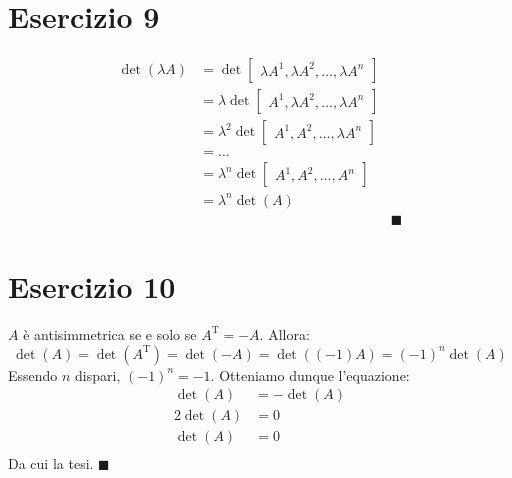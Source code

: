 \documentclass{article}
\newcommand*{\qed}{\blacksquare}
\newcommand*{\T}[1]{{#1}^\text{T}}  %
\newcommand*{\m}[1]{\begin{bmatrix}#1\end{bmatrix}}
\begin{document}
\section*{Esercizio 9}
\[\begin{aligned}
    \det(\lambda A) &=
    \det\m{
        \lambda A^1,\lambda A^2,\dots,\lambda A^n
    } \\ &=
    \lambda \det\m{
        A^1,\lambda A^2,\dots,\lambda A^n
    } \\ &=
    \lambda^2 \det\m{
        A^1, A^2,\dots,\lambda A^n
    } \\ &= \dots \\ &=
    \lambda^n\det\m{
        A^1,A^2,\dots,A^n
    } \\ &=
    \lambda^n\det(A) \\
    &&\qed
\end{aligned}\]

\section*{Esercizio 10}
$A$ è antisimmetrica se e solo se $\T{A}=-A$. Allora:
\[
    \det(A) =
    \det\left(\T{A}\right) =
    \det(-A) =
    \det\left((-1)A\right) =
    (-1)^n \det(A)
\]
Essendo $n$ dispari, $(-1)^n = -1$. Otteniamo dunque l'equazione:
\[\begin{aligned}
    \det(A) &= -\det(A) \\
    2 \det(A) &= 0 \\
    \det(A) &= 0 \\
\end{aligned}\]
Da cui la tesi. $\qed$
\end{document}
